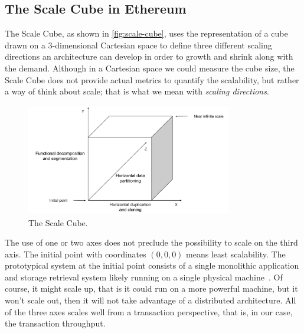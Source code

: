 \subsection{The Scale Cube in Ethereum}
\label{sec:scale-cube}

The Scale Cube, as shown in \autoref{fig:scale-cube}, uses the representation of
a cube drawn on a 3-dimensional Cartesian space to define three different
scaling directions an architecture can develop in order to growth and shrink
along with the demand. Although in a Cartesian space we could measure the cube
size, the Scale Cube does not provide actual metrics to quantify the
scalability, but rather a way of think about scale; that is what we mean with
\emph{scaling directions}.

\begin{figure}
	\begin{center}
		\includegraphics[width=0.8\textwidth]{./res/img/scale-cube.pdf}
	\end{center}
	\caption{The Scale Cube.}
	\label{fig:scale-cube}
\end{figure}

The use of one or two axes does not preclude the possibility to scale on the
third axis. The initial point with coordinates $(0,0,0)$ means least
scalability. The prototypical system at the initial point consists of a single
monolithic application and storage retrieval system likely running on a single
physical machine~\cite{bib:art-of-scalability}. Of course, it might scale up,
that is it could run on a more powerful machine, but it won't scale out, then it
will not take advantage of a distributed architecture. All of the three axes
scales well from a transaction perspective, that is, in our case, the
transaction throughput. %